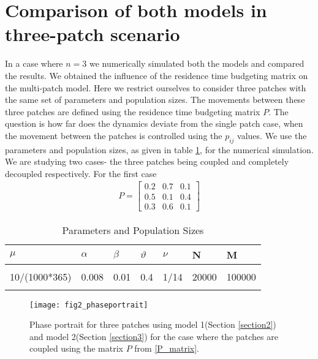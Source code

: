\documentclass{article}
\begin{document}
\section{Comparison of both models in three-patch scenario}
In a case where $n=3$ we numerically simulated both the models and  compared the results. We obtained the influence of the residence time budgeting matrix on the multi-patch model. Here we restrict ourselves to consider three patches with the same set of parameters and population sizes. The movements between these three patches are defined using the residence time budgeting matrix $P$. The question is how far does the dynamics deviate from the single patch case, when the movement between the patches is controlled using the $p_{ij}$ values. We use the parameters 
and population sizes, as given in table \ref{table1}, for the numerical simulation. We are studying two cases- the three patches being coupled and completely decoupled respectively. For the first case 
\begin{align}\label{P_matrix}
P =
 \begin{bmatrix}
 0.2 &0.7&0.1\\
 0.5&0.1&0.4\\
 0.3&0.6&0.1
  \end{bmatrix}
  \end{align}
\begin{table} 
\begin{center}
	\caption{Parameters and Population Sizes}
	{\footnotesize
		\begin{tabular}{p{2cm}p{1cm}p{1cm}p{1cm}p{1cm}p{1.5cm}p{1.5cm}}
			\hline\noalign{\smallskip}
			$\mu$ & $\alpha$ &$\beta$&$\vartheta$&$\nu$&N&M \\
\hline
\\
			10/(1000*365)          %
			&0.008						%
			& 0.01                    			%
			&0.4                    			%
			& 1/14                  			%
			& 20000
			& 100000\\
			\noalign{\smallskip}\hline\noalign{\smallskip}
	\end{tabular}}
\label{table1}
\end{center}
\end{table}
\begin{figure}[ht]
	\centering
	\texttt{[image: fig2\_phaseportrait]}
	\caption{Phase portrait for three patches using model 1(Section \ref{section2})  and model 2(Section \ref{section3}) for the case where the patches are coupled using the matrix $P$ from \eqref{P_matrix}.}
	\label{fig:fig2phaseportrait}
\end{figure}
\end{document}
